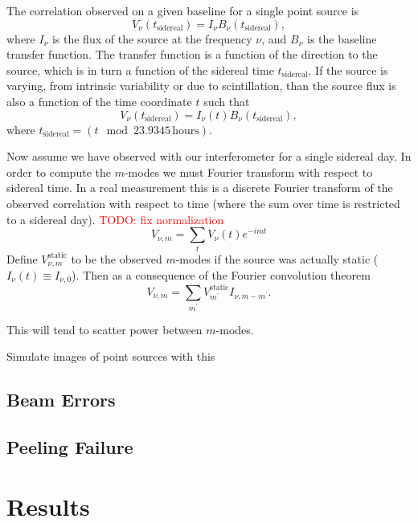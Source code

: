 \documentclass[twocolumn]{aastex6}
\newcommand{\todo}[1]{\textcolor{red}{TODO: #1}\PackageWarning{TODO:}{#1!}}
\begin{document}
The correlation observed on a given baseline for a single point source is
\begin{equation}
    V_\nu(t_{\textrm{sidereal}}) = I_\nu B_\nu(t_{\textrm{sidereal}}),
\end{equation}
where $I_\nu$ is the flux of the source at the frequency $\nu$, and $B_\nu$
is the baseline transfer function. The transfer function is a function of
the direction to the source, which is in turn a function of the sidereal
time $t_{\textrm{sidereal}}$. If the source is varying, from intrinsic
variability or due to scintillation, than the source flux is also a function
of the time coordinate $t$ such that
\begin{equation}
    V_\nu(t_{\textrm{sidereal}}) = I_\nu(t) B_\nu(t_{\textrm{sidereal}}),
\end{equation}
where $t_{\textrm{sidereal}} = (t \mod 23.9345\,\textrm{hours})$.

Now assume we have observed with our interferometer for a single sidereal day.
In order to compute the $m$-modes we must Fourier transform with respect to
sidereal time. In a real measurement this is a discrete Fourier transform of
the observed correlation with respect to time (where the sum over time is
restricted to a sidereal day). \todo{fix normalization}
\begin{equation}
    V_{\nu, m} = \sum_{t} V_\nu(t) e^{-imt}
\end{equation}
Define $V_{\nu, m}^{\textrm{static}}$ to be the observed $m$-modes if the source
was actually static ($I_\nu(t) \equiv I_{\nu,0}$). Then as a consequence of the
Fourier convolution theorem
\begin{equation}
    V_{\nu, m} = \sum_{m^\prime} V_{m^\prime}^\textrm{static} I_{\nu, m-m^\prime}.
\end{equation}

This will tend to scatter power between $m$-modes.

Simulate images of point sources with this



\subsection{Beam Errors}


\subsection{Peeling Failure}

\section{Results}
\end{document}

